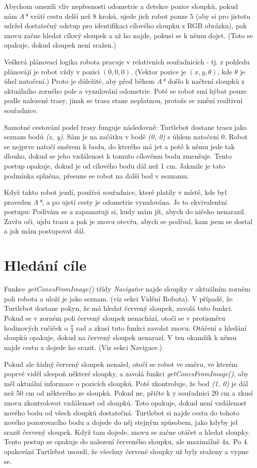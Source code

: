 \documentclass{article}
\begin{document}
Abychom omezili vliv nepřesnosti odometrie a detekce pozice sloupků, pokud nám \textit{A*} vrátí cestu delší než 8 kroků, ujede jich robot pouze 5 (aby si pro jistotu udržel dostatečný odstup pro identifikaci cílového sloupku z RGB obrázku), pak znovu začne hledat cílový sloupek a až ho najde, pokusí se k němu dojet. (Toto se opakuje, dokud sloupek není sražen.)

Veškerá plánovací logika robota pracuje v relativních souřadnicích - tj. z pohledu plánovájí je robot vždy v pozici $(0, 0, 0)$. (Vektor pozice je $(x, y, \theta)$, kde $\theta$ je úhel natočení.) Proto je důležité, aby před během \textit{A*} došlo k načtení sloupků z aktuálního zorného pole a vynulování odometrie. Poté se robot smí hýbat pouze podle nalezené trasy, jinak se trasa stane neplatnou, protože se změní realtivní souřadnice.

Samotné cestování podel trasy funguje následovně: Turtlebot dostane trasu jako seznam bodů \textit{(x, y)}. Sám je na začátku v bodě \textit{(0, 0)} s úhlem natočení 0. Robot se nejprve natočí směrem k bodu, do kterého má jet a poté k němu jede tak dlouho, dokud se jeho vzdálenost k tomuto cílovému bodu zmenšuje. Tento postup opakuje, dokud je od cílového bodu dál než 1 cm. Jakmile je tato podmínka splněna, přesune se robot na další bod v seznamu.

Když takto robot jezdí, používá souřadnice, které platily v místě, kde byl proveden \textit{A*}, a po ujetí cesty je odometrie vynulována. Je to ekvivalentní postupu: Podívám se a zapamatuji si, kudy mám jít, abych do ničeho nenarazil. Zavřu oči, ujdu trasu a pak je znovu otevřu, abych se podíval, kam jsem se dostal a jak mám postupovat dál.

\section{Hledání cíle}
Funkce \textit{getConesFromImage()} třídy \textit{Navigator} najde sloupky v aktuálním zorném poli robota a uloží je jako seznam. (viz sekci Vidění Robota).
V případě, že Turtlebot dostane pokyn, že má hledat červený sloupek, zavolá tuto funkci. Pokud se v zorném poli červený sloupek nenachází, otočí se v protisměru hodinových ručiček o $\frac{\pi}{4}$ rad a zkusí tuto funkci zavolat znovu. Otáčení a hledání sloupků opakuje, dokud na červený sloupek nenarazí. V ten okamžik k němu najde cestu a dojede ho srazit. (Viz sekci Navigace.)

Pokud ale žádný červený sloupek nenašel, otočí se robot ve směru, ve kterém poprvé viděl alespoň některé sloupky, a zavolá funkci \textit{getConesFromImage()}, aby měl aktuální informace o pozicích sloupků. Poté zkontroluje, že bod \textit{(1, 0)} je dál než 50 cm od některého ze sloupků. Pokud ne, přičte k y souřadnici 20 cm a zkusí znovu zkontrolovat vzdálenost od sloupků. Toto opakuje, dokud není vzdálenost nového bodu od všech sloupků dostatečná. Turtlebot si najde cestu do tohoto nového pozorovacího bodu a dojede do něj stejným způsobem, jako kdyby jel srazit červený sloupek. Když tam dojede, znovu se začne otáčet a hledat sloupky. Tento postup se opakuje do nalezení červeného sloupku, ale maximálně 4x. Po 4. opakování Turtlebot usoudí, že všechny červené sloupky už byly sraženy a vypne se.
\end{document}
